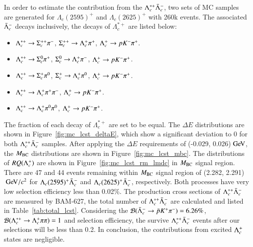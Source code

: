 In order to estimate the contribution from the $\Lambda_c^{*+}\bar{\Lambda}_{c}^{-}$, two sets of MC samples are generated for $\Lambda_c(2595)^+$ and $\Lambda_c(2625)^+$ with 260k events. The associated $\bar{\Lambda}_{c}^{-}$ decays inclusively, the decays of $\Lambda_c^{*+}$ are listed below:
\begin{itemize}
    \item $\Lambda_c^{*+} \rightarrow \Sigma_c^{++}\pi^-$, $\Sigma_c^{++} \rightarrow \Lambda_{c}^{+}\pi^+$, $\Lambda_{c}^{+} \rightarrow pK^-\pi^+$.
    \item $\Lambda_c^{*+} \rightarrow \Sigma_c^{0}\pi^+$, $\Sigma_c^{0} \rightarrow \Lambda_{c}^{+}\pi^-$, $\Lambda_{c}^{+} \rightarrow pK^-\pi^+$.
    \item $\Lambda_c^{*+} \rightarrow \Sigma_c^{+}\pi^{0}$, $\Sigma_c^{+} \rightarrow \Lambda_{c}^{+}\pi^{0}$, $\Lambda_{c}^{+} \rightarrow pK^-\pi^+$.
    \item $\Lambda_c^{*+} \rightarrow \Lambda_{c}^{+}\pi^+\pi^-$, $\Lambda_{c}^{+} \rightarrow pK^-\pi^+$. 
    \item $\Lambda_c^{*+} \rightarrow \Lambda_{c}^{+}\pi^{0}\pi^{0}$, $\Lambda_{c}^{+} \rightarrow pK^-\pi^+$.
\end{itemize}
The fraction of each decay of $\Lambda_c^{*+}$ are set to be equal. The $\Delta E$ distributions are shown in Figure~\ref{fig:mc_lcst_deltaE}, which show a significant deviation to 0 for both $\Lambda_c^{*+}\bar{\Lambda}_{c}^{-}$ samples. After applying the $\Delta E$ requirements of (-0.029, 0.026)$\gev$, the $M_{\rm{BC}}$ distributions are shown in Figure~\ref{fig:mc_lcst_mbc}. The distributions of $RQ(\Lambda_{c}^{+})$ are shown in Figure~\ref{fig:mc_lcst_rm_lmdc} in $M_{\rm{BC}}$ signal region. There are 47 and 44 events remaining within $M_{\rm{BC}}$ signal region of (2.282, 2.291)$\gev/c^2$ for $\Lambda_c(2595)^+\bar{\Lambda}_{c}^{-}$ and $\Lambda_c(2625)^+\bar{\Lambda}_{c}^{-}$, respectively. Both processes have very low selection efficiency less than 0.02\%. The production cross sections of $\Lambda_c^{*+}\bar{\Lambda}_{c}^{-}$ are measured by BAM-627, the total number of $\Lambda_c^{*+}\bar{\Lambda}_{c}^{-}$ are calculated and listed in Table~\ref{tab:total_lcst}. Considering the $\mathcal{B}(\bar{\Lambda}_{c}^{-} \rightarrow \bar{p}K^+\pi^-) = 6.26\%$, $\mathcal{B}(\Lambda_c^{*+} \rightarrow \Lambda_{c}^{+}\pi\pi) = 1$ and selection efficiency, the survive $\Lambda_c^{*+}\bar{\Lambda}_{c}^{-}$ events after our selections will be less than 0.2. In conclusion, the contributions from excited $\Lambda_{c}^{+}$ states are negligible.


